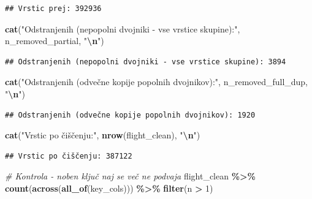 \documentclass[
]{article}
\newenvironment{Shaded}{\begin{snugshade}}{\end{snugshade}}
\newcommand{\CommentTok}[1]{\textcolor[rgb]{0.56,0.35,0.01}{\textit{#1}}}
\newcommand{\DecValTok}[1]{\textcolor[rgb]{0.00,0.00,0.81}{#1}}
\newcommand{\FunctionTok}[1]{\textcolor[rgb]{0.13,0.29,0.53}{\textbf{#1}}}
\newcommand{\NormalTok}[1]{#1}
\newcommand{\SpecialCharTok}[1]{\textcolor[rgb]{0.81,0.36,0.00}{\textbf{#1}}}
\newcommand{\StringTok}[1]{\textcolor[rgb]{0.31,0.60,0.02}{#1}}
\begin{document}
\begin{verbatim}
## Vrstic prej: 392936
\end{verbatim}

\begin{Shaded}
\begin{Highlighting}[]
\FunctionTok{cat}\NormalTok{(}\StringTok{"Odstranjenih (nepopolni dvojniki {-} vse vrstice skupine):"}\NormalTok{, n\_removed\_partial, }\StringTok{"}\SpecialCharTok{\textbackslash{}n}\StringTok{"}\NormalTok{)}
\end{Highlighting}
\end{Shaded}

\begin{verbatim}
## Odstranjenih (nepopolni dvojniki - vse vrstice skupine): 3894
\end{verbatim}

\begin{Shaded}
\begin{Highlighting}[]
\FunctionTok{cat}\NormalTok{(}\StringTok{"Odstranjenih (odvečne kopije popolnih dvojnikov):"}\NormalTok{, n\_removed\_full\_dup, }\StringTok{"}\SpecialCharTok{\textbackslash{}n}\StringTok{"}\NormalTok{)}
\end{Highlighting}
\end{Shaded}

\begin{verbatim}
## Odstranjenih (odvečne kopije popolnih dvojnikov): 1920
\end{verbatim}

\begin{Shaded}
\begin{Highlighting}[]
\FunctionTok{cat}\NormalTok{(}\StringTok{"Vrstic po čiščenju:"}\NormalTok{, }\FunctionTok{nrow}\NormalTok{(flight\_clean), }\StringTok{"}\SpecialCharTok{\textbackslash{}n}\StringTok{"}\NormalTok{)}
\end{Highlighting}
\end{Shaded}

\begin{verbatim}
## Vrstic po čiščenju: 387122
\end{verbatim}

\begin{Shaded}
\begin{Highlighting}[]
\CommentTok{\# Kontrola {-} noben ključ naj se več ne podvaja}
\NormalTok{flight\_clean }\SpecialCharTok{\%\textgreater{}\%} \FunctionTok{count}\NormalTok{(}\FunctionTok{across}\NormalTok{(}\FunctionTok{all\_of}\NormalTok{(key\_cols))) }\SpecialCharTok{\%\textgreater{}\%} \FunctionTok{filter}\NormalTok{(n }\SpecialCharTok{\textgreater{}} \DecValTok{1}\NormalTok{)}
\end{Highlighting}
\end{Shaded}
\end{document}
